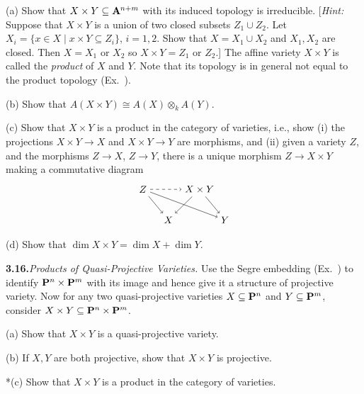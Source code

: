 {(a) Show that $X\times Y\subseteq\AffSpace{n+m}$ with its induced topology is irreducible. [\emph{Hint:} Suppose that $X\times Y$ is a union of two closed subsets $Z_1\cup Z_2$. Let $X_i=\{x\in X\mid x\times Y\subseteq Z_i\}$, $i=1,2$. Show that $X=X_1\cup X_2$ and $X_1,X_2$ are closed. Then $X=X_1$ or $X_2$ so $X\times Y=Z_1$ or $Z_2$.] The affine variety $X\times Y$ is called the \emph{product} of $X$ and $Y$. Note that its topology is in general not equal to the product topology (Ex.~).

(b) Show that $A(X\times Y)\cong A(X)\otimes_k A(Y)$.

(c) Show that $X\times Y$ is a product in the category of varieties, i.e., show (i) the projections $X\times Y\to X$ and $X\times Y\to Y$ are morphisms, and (ii) given a variety $Z$, and the morphisms $Z\to X$, $Z\to Y$, there is a unique morphism $Z\to X\times Y$ making a commutative diagram
\[
\begin{tikzpicture}[baseline=(current bounding box.center)]
\node (Z) at (0,1.1) {$Z$};
\node (P) at (2.0,1.1) {$X\times Y$};
\node (X) at (.9,0) {$X$};
\node (Y) at (2.9,0) {$Y$};
\draw[->,dashed] (Z)--(P);
\draw[->] (Z)--(X);
\draw[->] (Z)--(Y);
\draw[->] (P)--(X);
\draw[->] (P)--(Y);
\end{tikzpicture}
\]

(d) Show that $\dim X\times Y=\dim X+\dim Y$.

\smallskip
\noindent\hypertarget{ex-I-3.16}{}\textbf{3.16.}\enspace \emph{Products of Quasi-Projective Varieties.} Use the Segre embedding (Ex.~) to identify $\mathbf{P}^n\times\mathbf{P}^m$ with its image and hence give it a structure of projective variety. Now for any two quasi-projective varieties $X\subseteq\mathbf{P}^n$ and $Y\subseteq\mathbf{P}^m$, consider $X\times Y\subseteq\mathbf{P}^n\times\mathbf{P}^m$.

(a) Show that $X\times Y$ is a quasi-projective variety.

(b) If $X,Y$ are both projective, show that $X\times Y$ is projective.

*(c) Show that $X\times Y$ is a product in the category of varieties.%
}
